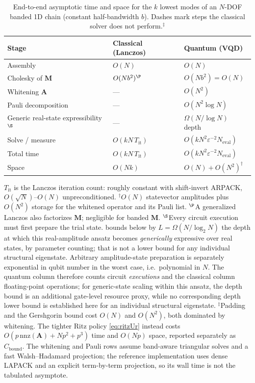 \documentclass{ieeeaccess}
\newcommand{\M}{\mathbf{M}}
\newcommand{\A}{\mathbf{A}}
\begin{document}
\begin{table}[t]
\centering
\caption{End-to-end asymptotic time and space for the $k$ lowest modes of an $N$-DOF banded 1D chain (constant half-bandwidth $b$). Dashes mark steps the classical solver does not perform.$^{\ddagger}$}
\label{tab:complexity}
\begin{tabular}{lll}
\toprule
Stage & Classical (Lanczos) & Quantum (VQD)\\
\midrule
Assembly & $O(N)$ & $O(N)$\\
Cholesky of $\M$ & $O(Nb^2)^{\P}$ & $O(Nb^2)=O(N)$\\
Whitening $\A$ & --- & $O(N^2)$\\
Pauli decomposition & --- & $O(N^2\log N)$\\
Generic real-state expressibility$^{\S}$ & --- & $\Omega(N/\log N)$ depth\\
Solve / measure & $O(kN\,T_{\mathrm{it}})$ & $O(kN^2\varepsilon^{-2}N_{\mathrm{eval}})$\\
\midrule
Total time & $O(kN\,T_{\mathrm{it}})$ & $O(kN^2\varepsilon^{-2}N_{\mathrm{eval}})$\\
Space & $O(Nk)$ & $O(N)+O(N^2)^{\dagger}$\\
\bottomrule
\end{tabular}

\vspace{0.35em}
\parbox{\columnwidth}{\footnotesize $T_{\mathrm{it}}$ is the Lanczos iteration count: roughly constant with shift-invert ARPACK, $O(\sqrt N)$--$O(N)$ unpreconditioned. $^{\dagger}$$O(N)$ statevector amplitudes plus $O(N^2)$ storage for the whitened operator and its Pauli list. $^{\P}$A generalized Lanczos also factorizes $\M$; negligible for banded $\M$. $^{\S}$Every circuit execution must first prepare the trial state.  bounds below by $L=\Omega(N/\log_2 N)$ the depth at which this real-amplitude ansatz becomes \emph{generically} expressive over real states, by parameter counting; that is not a lower bound for any individual structural eigenstate. Arbitrary amplitude-state preparation is separately exponential in qubit number in the worst case, i.e.\ polynomial in $N$. The quantum column therefore counts circuit \emph{executions} and the classical column floating-point operations; for generic-state scaling within this ansatz, the depth bound is an additional gate-level resource proxy, while no corresponding depth lower bound is established here for an individual structural eigenstate. $^{\ddagger}$Padding and the Gershgorin bound cost $O(N)$ and $O(N^2)$, both dominated by whitening. The tighter Ritz policy \eqref{eq:ritzUr} instead costs $O(p\,\mathrm{nnz}(\A)+Np^2+p^3)$ time and $O(Np)$ space, reported separately as $C_{\mathrm{bound}}$. The whitening and Pauli rows assume band-aware triangular solves and a fast Walsh--Hadamard projection; the reference implementation uses dense LAPACK and an explicit term-by-term projection, so its wall time is not the tabulated asymptote.}
\end{table}
\end{document}
